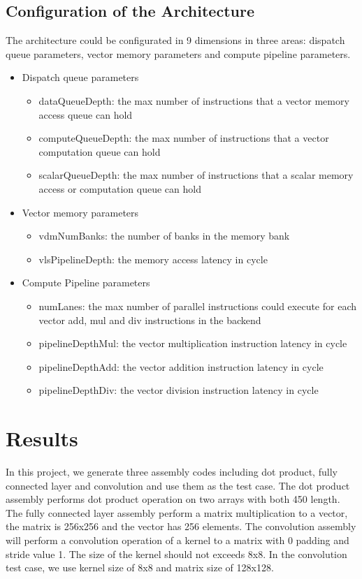\documentclass[conference]{IEEEtran}
\begin{document}
\subsection{Configuration of the Architecture}
The architecture could be configurated in 9 dimensions in three areas: dispatch queue parameters, vector memory parameters and compute pipeline parameters.
\begin{itemize}
    \item Dispatch queue parameters
    \begin{itemize}
        \item dataQueueDepth: the max number of instructions that a vector memory access queue can hold
        \item computeQueueDepth: the max number of instructions that a vector computation queue can hold
        \item scalarQueueDepth: the max number of instructions that a scalar memory access or computation queue can hold
    \end{itemize}
    \item Vector memory parameters
    \begin{itemize}
        \item vdmNumBanks: the number of banks in the memory bank
        \item vlsPipelineDepth: the memory access latency in cycle
    \end{itemize}
    \item Compute Pipeline parameters
    \begin{itemize}
        \item numLanes: the max number of parallel instructions could execute for each vector add, mul and div instructions in the backend 
        \item pipelineDepthMul: the vector multiplication instruction latency in cycle
        \item pipelineDepthAdd: the vector addition instruction latency in cycle
        \item pipelineDepthDiv: the vector division instruction latency in cycle
    \end{itemize}
\end{itemize}

\section{Results}
In this project, we generate three assembly codes including dot product, fully connected layer and convolution and use them as the test case. The dot product assembly performs dot product operation on two arrays with both 450 length. The fully connected layer assembly perform a matrix multiplication to a vector, the matrix is 256x256 and the vector has 256 elements. The convolution assembly will perform a convolution operation of a kernel to a matrix with 0 padding and stride value 1. The size of the kernel should not exceeds 8x8. In the convolution test case, we use kernel size of 8x8 and matrix size of 128x128.
\end{document}
